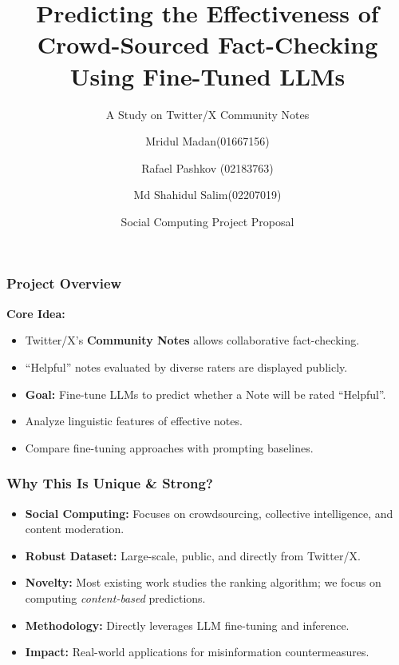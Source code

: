 \documentclass[11pt]{beamer}
\title[Community Notes Effectiveness]{Predicting the Effectiveness of Crowd-Sourced Fact-Checking Using Fine-Tuned LLMs}
\subtitle{A Study on Twitter/X Community Notes}
\author[Madan, Pashkov, Salim]{Mridul Madan(01667156) \and Rafael Pashkov (02183763) \and Md Shahidul Salim(02207019)}
\institute[UMass Lowell]{University of Massachusetts Lowell}
\date{Social Computing Project Proposal}
\begin{document}
\begin{frame}
    \titlepage
\end{frame}

\begin{frame}
    \frametitle{Project Overview}
    \textbf{Core Idea:} 
    \begin{itemize}
        \item Twitter/X's \textbf{Community Notes} allows collaborative fact-checking.
        \item ``Helpful'' notes evaluated by diverse raters are displayed publicly.
        \item \textbf{Goal:} Fine-tune LLMs to predict whether a Note will be rated ``Helpful''.
        \item Analyze linguistic features of effective notes.
        \item Compare fine-tuning approaches with prompting baselines.
    \end{itemize}
\end{frame}

\begin{frame}
    \frametitle{Why This Is Unique \& Strong?}
    \begin{itemize}
        \item \textbf{Social Computing:} Focuses on crowdsourcing, collective intelligence, and content moderation.
        \item \textbf{Robust Dataset:} Large-scale, public, and directly from Twitter/X.
        \item \textbf{Novelty:} Most existing work studies the ranking algorithm; we focus on computing \textit{content-based} predictions.
        \item \textbf{Methodology:} Directly leverages LLM fine-tuning and inference.
        \item \textbf{Impact:} Real-world applications for misinformation countermeasures.
    \end{itemize}
\end{frame}
\end{document}
